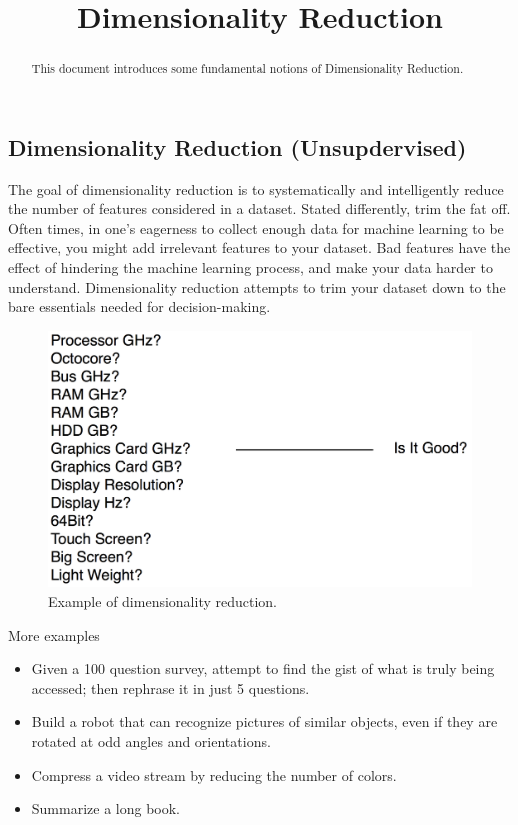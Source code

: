 \documentclass{article}
\begin{document}
\title{Dimensionality Reduction}

\maketitle

\begin{abstract}
This document introduces some fundamental notions of Dimensionality Reduction.
\end{abstract}

\subsection{Dimensionality Reduction (Unsupdervised)}
\par The goal of dimensionality reduction is to systematically and intelligently reduce the number of features considered in a dataset. Stated differently, trim the fat off. Often times, in one's eagerness to collect enough data for machine learning to be effective, you might add irrelevant features to your dataset. Bad features have the effect of hindering the machine learning process, and make your data harder to understand. Dimensionality reduction attempts to trim your dataset down to the bare essentials needed for decision-making.

\begin{figure}[H]
\centering
\includegraphics[width=0.6\linewidth]{pic/dimensionality-reduction.png}
\caption{Example of dimensionality reduction.}
\end{figure}

More examples

\begin{itemize}
    \item Given a 100 question survey, attempt to find the gist of what is truly being accessed; then rephrase it in just 5 questions.
    \item Build a robot that can recognize pictures of similar objects, even if they are rotated at odd angles and orientations.
    \item Compress a video stream by reducing the number of colors.
    \item Summarize a long book.
\end{itemize}
\end{document}
